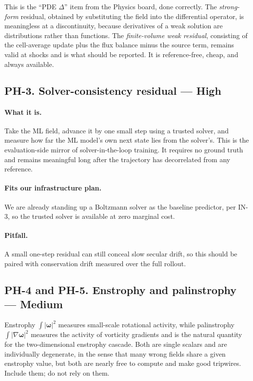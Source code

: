 \documentclass[11pt]{article}
\newcommand{\High}{\textbf{High}}
\newcommand{\Med}{Medium}
\begin{document}
This is the ``PDE $\Delta$'' item from the Physics board, done correctly. The
\emph{strong-form} residual, obtained by substituting the field into the differential
operator, is meaningless at a discontinuity, because derivatives of a weak solution are
distributions rather than functions. The \emph{finite-volume weak residual}, consisting of
the cell-average update plus the flux balance minus the source term, remains valid at shocks
and is what should be reported. It is reference-free, cheap, and always available.

\subsection{PH-3. Solver-consistency residual --- \High{}}

\paragraph{What it is.} Take the ML field, advance it by one small step using a trusted
solver, and measure how far the ML model's own next state lies from the solver's. This is
the evaluation-side mirror of solver-in-the-loop training. It requires no ground truth and
remains meaningful long after the trajectory has decorrelated from any reference.

\paragraph{Fits our infrastructure plan.} We are already standing up a Boltzmann solver as
the baseline predictor, per IN-3, so the trusted solver is available at zero marginal cost.

\paragraph{Pitfall.} A small one-step residual can still conceal slow secular drift, so this
should be paired with conservation drift measured over the full rollout.

\subsection{PH-4 and PH-5. Enstrophy and palinstrophy --- \Med{}}

Enstrophy $\int |\boldsymbol{\omega}|^2$ measures small-scale rotational activity, while
palinstrophy $\int |\nabla \boldsymbol{\omega}|^2$ measures the activity of vorticity
gradients and is the natural quantity for the two-dimensional enstrophy cascade. Both are
single scalars and are individually degenerate, in the sense that many wrong fields share a
given enstrophy value, but both are nearly free to compute and make good tripwires. Include
them; do not rely on them.
\end{document}
